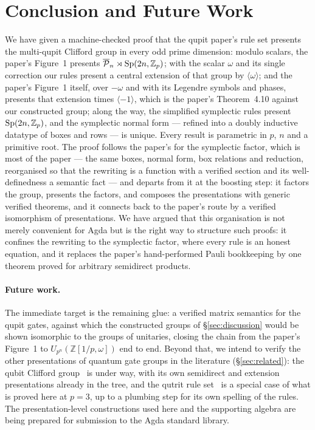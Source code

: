 \section{Conclusion and Future Work}\label{sec:conclusion}

We have given a machine-checked proof that the qupit paper's rule set
presents the multi-qupit Clifford group in every odd prime dimension:
modulo scalars, the paper's Figure~1 presents $\overline{\mathcal{P}}_{n} \rtimes \mathrm{Sp}(2n,\mathbb{Z}_p)$;
with the scalar $\omega$ and its single correction our rules present a
central extension of that group by $\langle\omega\rangle$; and the
paper's Figure~1 itself, over $-\omega$ and with its Legendre symbols and
phases, presents that extension times $\langle -1\rangle$, which is the
paper's Theorem~4.10 against our constructed group; along the way, the
simplified symplectic rules present $\mathrm{Sp}(2n,\mathbb{Z}_p)$, and the symplectic normal form
--- refined into a doubly inductive datatype of boxes and rows --- is
unique.  Every result is parametric in $p$, $n$ and a primitive root.
The proof follows the paper's for the symplectic factor, which is most
of the paper --- the same boxes, normal form, box relations and
reduction, reorganised so that the rewriting is a function with a
verified section and its well-definedness a semantic fact --- and
departs from it at the boosting step: it factors the group, presents the
factors, and composes the presentations with generic verified theorems,
and it connects back to the paper's route by a verified isomorphism of
presentations.  We have argued that this organisation is not merely
convenient for Agda but is the right way to structure such proofs: it
confines the rewriting to the symplectic factor, where every rule is an
honest equation, and it replaces the paper's hand-performed Pauli
bookkeeping by one theorem proved for arbitrary semidirect products.

\paragraph{Future work.}  The immediate target is the remaining glue: a
verified matrix semantics for the qupit gates, against which the
constructed groups of \S\ref{sec:discussion} would be shown isomorphic
to the groups of unitaries, closing the chain from the paper's Figure~1 to
$U_{p^n}(\mathbb{Z}[1/p, \omega])$ end to end.  Beyond that, we intend
to verify the other presentations of quantum gate groups in the
literature (\S\ref{sec:related}): the qubit Clifford
group~\cite{selinger2015clifford} is under way, with its own semidirect
and extension presentations already in the tree, and the qutrit rule
set~\cite{li2025qutrit} is a special case of what is proved here at
$p = 3$, up to a plumbing step for its own spelling of the rules.  The
presentation-level constructions used here and the supporting algebra
are being prepared for submission to the Agda standard library.
